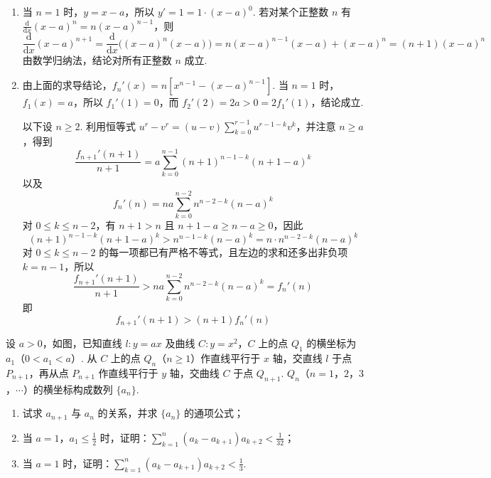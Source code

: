 \begin{solution}
\begin{enumerate}
\item 当 \(n=1\) 时，\(y=x-a\)，所以 \(y'=1=1\cdot(x-a)^{0}\). 若对某个正整数 \(n\) 有 \(\frac{\mathrm d}{\mathrm dx}(x-a)^{n}=n(x-a)^{n-1}\)，则
\[
\frac{\mathrm d}{\mathrm dx}(x-a)^{n+1}=\frac{\mathrm d}{\mathrm dx}\bigl((x-a)^{n}(x-a)\bigr)=n(x-a)^{n-1}(x-a)+(x-a)^{n}=(n+1)(x-a)^{n}
\]
由数学归纳法，结论对所有正整数 \(n\) 成立.
\item 由上面的求导结论，\(f_n'(x)=n\left[x^{n-1}-(x-a)^{n-1}\right]\). 当 \(n=1\) 时，\(f_1(x)=a\)，所以 \(f_1'(1)=0\)，而 \(f_2'(2)=2a>0=2f_1'(1)\)，结论成立.

以下设 \(n\geqslant2\). 利用恒等式 \(u^r-v^r=(u-v)\sum_{k=0}^{r-1}u^{r-1-k}v^k\)，并注意 \(n\geqslant a\)，得到
\[
\frac{f_{n+1}'(n+1)}{n+1}=a\sum_{k=0}^{n-1}(n+1)^{n-1-k}(n+1-a)^k
\]
以及
\[
f_n'(n)=na\sum_{k=0}^{n-2}n^{n-2-k}(n-a)^k
\]
对 \(0\leqslant k\leqslant n-2\)，有 \(n+1>n\) 且 \(n+1-a\geqslant n-a\geqslant0\)，因此
        \[
        (n+1)^{n-1-k}(n+1-a)^k>n^{n-1-k}(n-a)^k
        =n\cdot n^{n-2-k}(n-a)^k
        \]
        对 \(0\leqslant k\leqslant n-2\) 的每一项都已有严格不等式，且左边的求和还多出非负项 \(k=n-1\)，所以
        \[
        \frac{f_{n+1}'(n+1)}{n+1}
        >na\sum_{k=0}^{n-2}n^{n-2-k}(n-a)^k
        =f_n'(n)
        \]
        即
\[
f_{n+1}'(n+1)>(n+1)f_n'(n)
\]
\end{enumerate}
\end{solution}

\begin{problem}
设 \(a > 0\)，如图，已知直线 \(l: y = ax\) 及曲线 \(C: y = x^2\)，\(C\) 上的点 \(Q_1\) 的横坐标为 \(a_1\)（\(0 < a_1 < a\)）. 从 \(C\) 上的点 \(Q_n\)（\(n \geqslant 1\)）作直线平行于 \(x\) 轴，交直线 \(l\) 于点 \(P_{n+1}\)，再从点 \(P_{n+1}\) 作直线平行于 \(y\) 轴，交曲线 \(C\) 于点 \(Q_{n+1}\). \(Q_n\)（\(n = 1\)，\(2\)，\(3\)，\(\cdots\)）的横坐标构成数列 \(\{a_n\}\).

\begin{enumerate}
\item 试求 \(a_{n+1}\) 与 \(a_n\) 的关系，并求 \(\{a_n\}\) 的通项公式；
\item 当 \(a = 1\)，\(a_1 \leqslant \frac{1}{2}\) 时，证明：\(\sum_{k=1}^{n} (a_k - a_{k+1}) a_{k+2} < \frac{1}{32}\)；
\item 当 \(a = 1\) 时，证明：\(\sum_{k=1}^{n} (a_k - a_{k+1}) a_{k+2} < \frac{1}{3}\).
\end{enumerate}

\end{problem}

